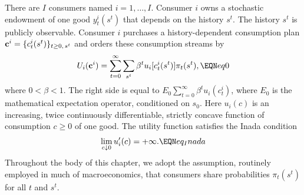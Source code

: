 There are $I$ consumers named $i=1, \ldots , I$. Consumer $i$
owns a stochastic endowment of one good
$y_t^i(s^t)$ that depends on the
history $s^t$.
The history $s^t$ is publicly observable.
Consumer $i$
purchases a history-dependent  consumption plan ${\bf c}^i =
 \{c_t^i(s^t)\}_{t\geq0,\,s^t}$ and
orders these
consumption streams by
%
%
$$ U_i({\bf c}^i) =
   \sum_{t=0}^\infty \sum_{s^t} \beta^t u_i[c_t^i(s^t)]
   \pi_t(s^t),
 \EQN eq0 $$
 where $0 < \beta < 1$.
The right side is equal to $ E_0 \sum_{t=0}^\infty \beta^t
u_i(c_t^i) $, where $E_0$ is the mathematical expectation operator,
conditioned on $s_0$. Here $u_i(c)$ is an increasing, twice
continuously differentiable, strictly concave function of
consumption $c\geq 0$  of one good. The utility function satisfies
the Inada condition
$$ \lim_{c \downarrow 0} u'_i(c) = +\infty.  \EQN eq_Inada $$
Throughout the body  of this chapter, we adopt the assumption, routinely
employed in much of macroeconomics,
that  consumers share   probabilities $\pi_t(s^t)$ for all $t$ and $s^t$.

